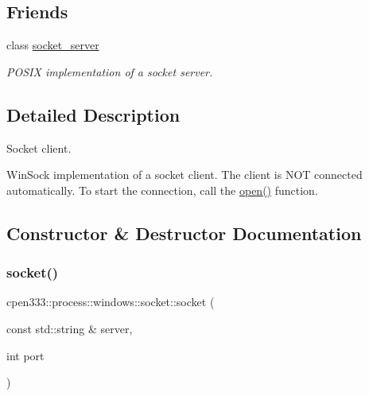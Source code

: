\subsection*{Friends}
\begin{DoxyCompactItemize}
\item 
class \hyperlink{classcpen333_1_1process_1_1windows_1_1socket_aba37c0ea463da9263b0712d3b3389066}{socket\+\_\+server}
\begin{DoxyCompactList}\small\item\em P\+O\+S\+IX implementation of a socket server. \end{DoxyCompactList}\end{DoxyCompactItemize}


\subsection{Detailed Description}
Socket client. 

Win\+Sock implementation of a socket client. The client is N\+OT connected automatically. To start the connection, call the \hyperlink{classcpen333_1_1process_1_1windows_1_1socket_a6d75767fbb202435906eac08a0e63c28}{open()} function. 

\subsection{Constructor \& Destructor Documentation}
\mbox{\label{classcpen333_1_1process_1_1windows_1_1socket_a51cd5207c99620a0a23e6d4b6684cacc}} 
\subsubsection{\texorpdfstring{socket()}{socket()}\hspace{0.1cm}{\footnotesize\ttfamily [1/2]}}
{\footnotesize\ttfamily cpen333\+::process\+::windows\+::socket\+::socket (\begin{DoxyParamCaption}\item[{const std\+::string \&}]{server,  }\item[{int}]{port }\end{DoxyParamCaption})\hspace{0.3cm}{\ttfamily [inline]}}



